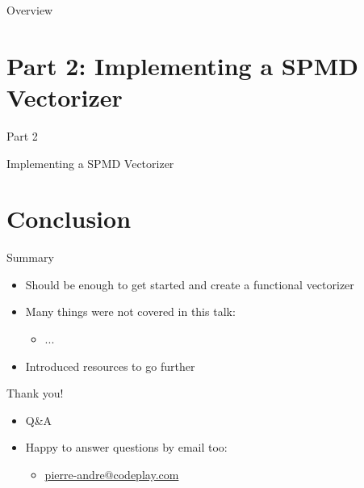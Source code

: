 \documentclass[t]{beamer}
\newcommand{\talkpart}[2]{%
\section{Part #1: #2}

\begin{frame}[c]{Part #1}

\vspace{1cm}
\centerline{\LARGE{#2}}

\end{frame}}
\begin{document}

\begin{frame}{Overview}
\tableofcontents
\end{frame}


%

\talkpart{2}{Implementing a SPMD Vectorizer}


%


\section*{Conclusion}

\begin{frame}{Summary}

\begin{itemize}
    \item Should be enough to get started and create a functional vectorizer
    \item Many things were not covered in this talk:
    \begin{itemize}
        \item ...
    \end{itemize}
    \item Introduced resources to go further
\end{itemize}

\end{frame}


\begin{frame}{Thank you!}

\begin{itemize}
    \item Q\&A
    \item Happy to answer questions by email too:
    \begin{itemize}
        \item \url{pierre-andre@codeplay.com}
    \end{itemize}
\end{itemize}

\end{frame}

\end{document}

